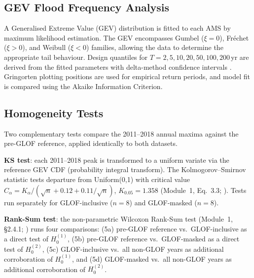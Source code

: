 \subsection{GEV Flood Frequency Analysis}

A Generalised Extreme Value (GEV) distribution is fitted to each AMS by maximum
likelihood estimation. The GEV encompasses Gumbel ($\xi = 0$), Fr\'{e}chet ($\xi > 0$),
and Weibull ($\xi < 0$) families, allowing the data to determine the appropriate tail
behaviour. Design quantiles for $T = 2, 5, 10, 20, 50, 100, 200$\,yr are derived from
the fitted parameters with delta-method confidence intervals \citep{Wilks2011}. Gringorten plotting
positions are used for empirical return periods, and model fit is compared using the
Akaike Information Criterion.

\subsection{Homogeneity Tests}
\label{sec:methods:tests}

Two complementary tests compare the 2011--2018 annual maxima against the pre-GLOF
reference, applied identically to both datasets.

\textbf{KS test}: each 2011--2018 peak is transformed to a uniform variate via the
reference GEV CDF (probability integral transform). The Kolmogorov--Smirnov statistic
tests departure from Uniform(0,1) with critical value
$C_\alpha = K_\alpha / (\sqrt{n} + 0.12 + 0.11/\sqrt{n})$, $K_{0.05} = 1.358$
(Module~1, Eq.~3.3; \citealt{Passalacqua2026}). Tests run separately for GLOF-inclusive ($n = 8$) and
GLOF-masked ($n = 8$).

\textbf{Rank-Sum test}: the non-parametric Wilcoxon Rank-Sum test (Module~1, \S2.4.1; \citealt{Passalacqua2026})
runs four comparisons: (5a) pre-GLOF reference vs.\ GLOF-inclusive as a direct test
of $H_0^{(1)}$, (5b) pre-GLOF reference vs.\ GLOF-masked as a direct test of
$H_0^{(2)}$, (5c) GLOF-inclusive vs.\ all non-GLOF years as additional corroboration
of $H_0^{(1)}$, and (5d) GLOF-masked vs.\ all non-GLOF years as additional
corroboration of $H_0^{(2)}$.
